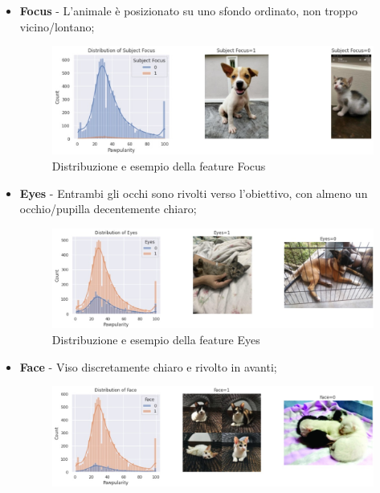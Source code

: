     \begin{itemize}
        \item \textbf{Focus} - L'animale è posizionato su uno sfondo ordinato, non troppo vicino/lontano;
        \begin{figure}[H]
            \centering
            \includegraphics[scale=0.5]{Plot/distribution_subjectfocus.jpg}
            \caption{Distribuzione e esempio della feature Focus}
            \label{fig:focus}
        \end{figure}
        \item \textbf{Eyes} - Entrambi gli occhi sono rivolti verso l'obiettivo, con almeno un occhio/pupilla decentemente chiaro;
        \begin{figure}[H]
            \centering
            \includegraphics[scale=0.5]{Plot/distribution_eyes.jpg}
            \caption{Distribuzione e esempio della feature Eyes}
            \label{fig:eyes}
        \end{figure}
        \item \textbf{Face} - Viso discretamente chiaro e rivolto in avanti;
        \begin{figure}[H]
            \centering
            \includegraphics[scale=0.5]{Plot/distribution_face.jpg}

\end{figure}
\end{itemize}
